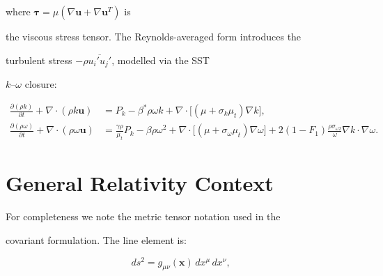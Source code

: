 \documentclass{article}
\begin{document}
where $\boldsymbol{\tau} = \mu(\nabla\mathbf{u} + \nabla\mathbf{u}^T)$ is

the viscous stress tensor.  The Reynolds-averaged form introduces the

turbulent stress $-\rho\overline{u_i' u_j'}$, modelled via the SST

$k$--$\omega$ closure:



\begin{align}

  \frac{\partial(\rho k)}{\partial t} + \nabla \cdot (\rho k \mathbf{u})

    &= P_k - \beta^* \rho \omega k

       + \nabla \cdot \bigl[(\mu + \sigma_k \mu_t)\nabla k\bigr], \\

  \frac{\partial(\rho \omega)}{\partial t}

    + \nabla \cdot (\rho \omega \mathbf{u})

    &= \frac{\gamma \rho}{\mu_t} P_k - \beta \rho \omega^2

       + \nabla \cdot \bigl[(\mu + \sigma_\omega \mu_t)\nabla \omega\bigr]

       + 2(1-F_1)\frac{\rho \sigma_{\omega 2}}{\omega}

         \nabla k \cdot \nabla \omega.

\end{align}




\section{General Relativity Context}




For completeness we note the metric tensor notation used in the

covariant formulation.  The line element is:



\begin{equation}

  ds^2 = g_{\mu\nu}(\mathbf{x})\, dx^\mu \, dx^\nu,

  \label{eq:metric}

\end{equation}
\end{document}
